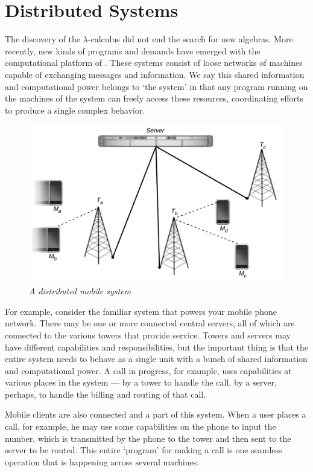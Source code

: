 \section{Distributed Systems}
The discovery of the $\lambda$-calculus did not end the search for new algebras.  
More recently, new kinds of programs and demands have emerged with the computational platform of .
These systems consist of loose networks of machines capable of exchanging messages and information.  
We say this shared information and computational power belongs to `the system' in that any program running on the machines of the system can freely access these resources, coordinating efforts to produce a single complex behavior.
\begin{figure}[H]
\centering
\includegraphics[scale=0.7]{figures/cell_network.pdf} %
\caption{\emph{A distributed mobile system}}
\label{fig_cell_network}
\end{figure}

For example, consider the familiar system that powers your mobile phone network.  
There may be one or more connected central servers, all of which are connected to the various towers that provide service.  
Towers and servers may have different capabilities and responsibilities, but the important thing is that the entire system needs to behave as a single unit with a bunch of shared information and computational power.  
A call in progress, for example, uses capabilities at various places in the system ---  by a tower to handle the call, by a server, perhaps, to handle the billing and routing of that call.  

Mobile clients are also connected and a part of this system.  
When a user places a call, for example, he may use some capabilities on the phone to input the number, which is transmitted by the phone to the tower and then sent to the server to be routed.  
This entire `program' for making a call is one seamless operation that is happening across several machines.  


